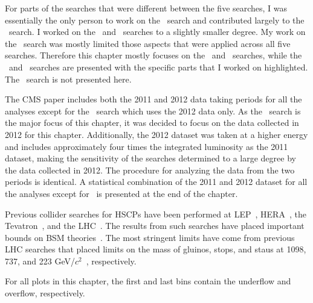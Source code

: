 For parts of the searches that were different between the five searches,
I was essentially the only person to work on the \muononly\ search and contributed largely to the \tktof\ search.
I worked on the \tkonly\ and \multi\ searches to a slightly smaller degree. My work on the \fract\ search was mostly limited those aspects 
that were applied across all five searches. 
Therefore this chapter mostly focuses on the \muononly\ and \tktof\ searches, while the \tkonly\ and \multi\ searches are presented
with the specific parts that I worked on highlighted. The \fract\ search is not presented here.

The CMS paper includes both the 2011 and 2012 data taking periods for all the analyses except for the \muononly\ search which uses the 2012 data only. 
As the \muononly\ search is the major focus of this chapter, it was decided to focus on the data collected in 2012 for this chapter.
Additionally, the 2012 dataset was taken at a higher energy and includes approximately four times the integrated luminosity as the 2011 dataset,
making the sensitivity of the searches determined to a large degree by the data collected in 2012.
The procedure for analyzing the data from the two periods is identical.
A statistical combination of the 2011 and 2012 dataset for all the analyses except for \muononly\ is presented at the end of the chapter. 

Previous collider searches for HSCPs have been performed at LEP~\cite{Barate:1997dr, Abreu:2000tn, Achard:2001qw, Abbiendi:2003yd}, HERA~\cite{Aktas:2004pq},
the Tevatron~\cite{Abazov:2008qu, Aaltonen:2009kea, Abazov:2011pf,Abazov:2012ab},
and the LHC~\cite{Khachatryan:2011ts, Aad:2011mb,  Aad:2011yf, Aad:2011hz, CMS:2012xi, Chatrchyan:2012sp, Aad:2012vd, Aad:2013pqd}.
The results from such searches have placed important bounds on BSM theories~\cite{Berger:2008cq, CahillRowley:2012kx}. 
The most stringent limits have come from previous LHC searches that placed limits on the mass of gluinos, stops, and staus at 1098,
737, and 223 GeV/$c^2$~\cite{Chatrchyan:2012sp}, respectively.

For all plots in this chapter, the first and last bins contain the underflow and overflow, respectively.













